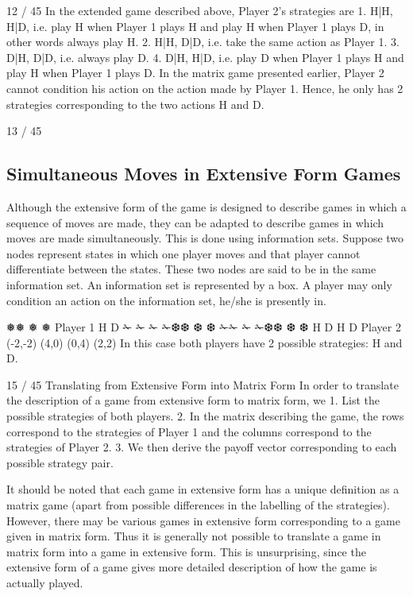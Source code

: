 12 / 45
In the extended game described above, Player 2’s strategies are
1. H|H, H|D, i.e. play H when Player 1 plays H and
play H when Player 1 plays D, in other words always
play H.
2. H|H, D|D, i.e. take the same action as Player 1.
3. D|H, D|D, i.e. always play D.
4. D|H, H|D, i.e. play D when Player 1 plays H and
play H when Player 1 plays D.
In the matrix game presented earlier, Player 2 cannot condition his
action on the action made by Player 1. Hence, he only has 2
strategies corresponding to the two actions H and D.

13 / 45
\subsection{Simultaneous Moves in Extensive Form Games}
Although the extensive form of the game is designed to describe
games in which a sequence of moves are made, they can be
adapted to describe games in which moves are made
simultaneously.
This is done using information sets. Suppose two nodes represent
states in which one player moves and that player cannot
differentiate between the states.
These two nodes are said to be in the same information set. An
information set is represented by a box.
A player may only condition an action on the information set,
he/she is presently in.




❅❅
❅
❅
Player 1
H D
✁
✁
✁
✁❆❆
❆
❆ ✁✁
✁
✁❆❆
❆
❆
H D H D
Player 2
(-2,-2) (4,0) (0,4) (2,2)
In this case both players have 2 possible strategies: H and D.

15 / 45
Translating from Extensive Form into Matrix Form
In order to translate the description of a game from extensive form
to matrix form, we
1. List the possible strategies of both players.
2. In the matrix describing the game, the rows
correspond to the strategies of Player 1 and the
columns correspond to the strategies of Player 2.
3. We then derive the payoff vector corresponding to
each possible strategy pair.

It should be noted that each game in extensive form has a unique
definition as a matrix game (apart from possible differences in the
labelling of the strategies).
However, there may be various games in extensive form
corresponding to a game given in matrix form. Thus it is generally
not possible to translate a game in matrix form into a game in
extensive form.
This is unsurprising, since the extensive form of a game gives more
detailed description of how the game is actually played.

